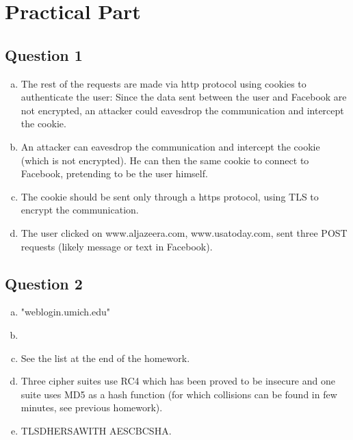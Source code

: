 \documentclass{article}
\begin{document}
\section{Practical Part}
\subsection{Question 1}
\begin{enumerate}[(a)]
\item The rest of the requests are made via http protocol using cookies to authenticate the user:
Since the data sent between the user and Facebook are not encrypted, an attacker could eavesdrop the communication and intercept the cookie.
\item An attacker can eavesdrop the communication and intercept the cookie (which is not encrypted). He can then the same cookie to connect to Facebook, pretending to be the user himself. 
\item The cookie should be sent only through a https protocol, using TLS to encrypt the communication.
\item The user clicked on www.aljazeera.com, www.usatoday.com, sent three POST requests (likely message or text in Facebook).
\end{enumerate}

\subsection{Question 2}

\begin{enumerate}[(a)]
	\item "weblogin.umich.edu" 
	\item 
	\item See the list at the end of the homework.
	\item Three cipher suites use RC4 which has been proved to be insecure and one suite uses MD5 as a hash function (for which collisions can be found in few minutes, see previous homework).
	\item TLS\textunderscore DHE\textunderscore RSA\textunderscore WITH \textunderscore AES\textunderscore CBC\textunderscore SHA.
\end{enumerate}
\end{document}

